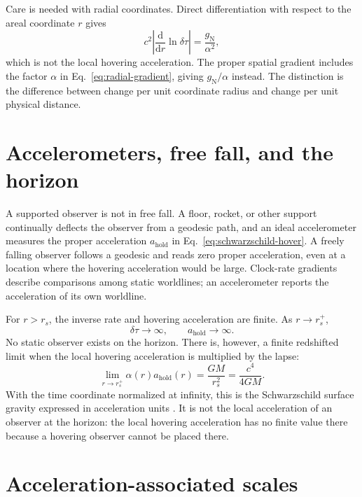 \documentclass[12pt]{article}
\begin{document}
Care is needed with radial coordinates. Direct differentiation with respect to the areal coordinate $r$ gives
\begin{equation}
  c^2\left|\frac{\mathrm{d}}{\mathrm{d}r}\ln\delta\tau\right|
  =\frac{g_{\mathrm{N}}}{\alpha^2},
  \label{eq:coordinate-gradient}
\end{equation}
which is not the local hovering acceleration. The proper spatial gradient includes the factor $\alpha$ in Eq.~\eqref{eq:radial-gradient}, giving $g_{\mathrm{N}}/\alpha$ instead. The distinction is the difference between change per unit coordinate radius and change per unit physical distance.

\section{Accelerometers, free fall, and the horizon}

A supported observer is not in free fall. A floor, rocket, or other support continually deflects the observer from a geodesic path, and an ideal accelerometer measures the proper acceleration $a_{\mathrm{hold}}$ in Eq.~\eqref{eq:schwarzschild-hover}. A freely falling observer follows a geodesic and reads zero proper acceleration, even at a location where the hovering acceleration would be large. Clock-rate gradients describe comparisons among static worldlines; an accelerometer reports the acceleration of its own worldline.

For $r>r_s$, the inverse rate and hovering acceleration are finite. As $r\to r_s^+$,
\begin{equation}
  \delta\tau\longrightarrow\infty,
  \qquad
  a_{\mathrm{hold}}\longrightarrow\infty.
  \label{eq:horizon-divergence}
\end{equation}
No static observer exists on the horizon. There is, however, a finite redshifted limit when the local hovering acceleration is multiplied by the lapse:
\begin{equation}
  \lim_{r\to r_s^+}\alpha(r)a_{\mathrm{hold}}(r)
  =\frac{GM}{r_s^2}
  =\frac{c^4}{4GM}.
  \label{eq:surface-gravity}
\end{equation}
With the time coordinate normalized at infinity, this is the Schwarzschild surface gravity expressed in acceleration units \cite{Wald,TaylorWheeler}. It is not the local acceleration of an observer at the horizon: the local hovering acceleration has no finite value there because a hovering observer cannot be placed there.

\section{Acceleration-associated scales}
\end{document}
